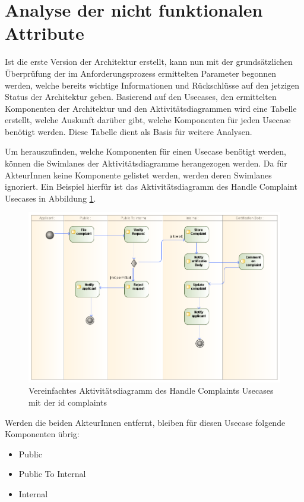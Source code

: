 \section{Analyse der nicht funktionalen Attribute}
Ist die erste Version der Architektur erstellt, kann nun mit der grundsätzlichen Überprüfung der im Anforderungsprozess ermittelten Parameter begonnen werden, welche bereits wichtige Informationen und Rückschlüsse auf den jetzigen Status der Architektur geben. Basierend auf den Usecases, den ermittelten Komponenten der Architektur und den Aktivitätsdiagrammen wird eine Tabelle erstellt, welche Auskunft darüber gibt, welche Komponenten für jeden Usecase benötigt werden. Diese Tabelle dient als Basis für weitere Analysen.

Um herauszufinden, welche Komponenten für einen Usecase benötigt werden, können die Swimlanes der Aktivitätsdiagramme herangezogen werden. Da für AkteurInnen keine Komponente gelistet werden, werden deren Swimlanes ignoriert. Ein Beispiel hierfür ist das Aktivitätsdiagramm des Handle Complaint Usecases in Abbildung \ref{fig:handlecomplaintreview}.

\begin{figure}[H]
    \centering
    \includegraphics[scale=0.5]{uml/handlecomplaintsactivityreview.png}
    \caption{Vereinfachtes Aktivitätsdiagramm des Handle Complaints Usecases mit der id complaints}
    \label{fig:handlecomplaintreview}
\end{figure}

Werden die beiden AkteurInnen entfernt, bleiben für diesen Usecase folgende Komponenten übrig:

\begin{itemize}
  \item Public
  \item Public To Internal
  \item Internal
\end{itemize}

